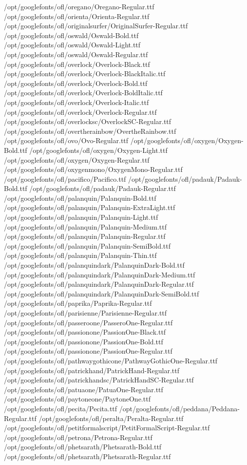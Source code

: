 /opt/googlefonts/ofl/oregano/Oregano-Regular.ttf
/opt/googlefonts/ofl/orienta/Orienta-Regular.ttf
/opt/googlefonts/ofl/originalsurfer/OriginalSurfer-Regular.ttf
/opt/googlefonts/ofl/oswald/Oswald-Bold.ttf
/opt/googlefonts/ofl/oswald/Oswald-Light.ttf
/opt/googlefonts/ofl/oswald/Oswald-Regular.ttf
/opt/googlefonts/ofl/overlock/Overlock-Black.ttf
/opt/googlefonts/ofl/overlock/Overlock-BlackItalic.ttf
/opt/googlefonts/ofl/overlock/Overlock-Bold.ttf
/opt/googlefonts/ofl/overlock/Overlock-BoldItalic.ttf
/opt/googlefonts/ofl/overlock/Overlock-Italic.ttf
/opt/googlefonts/ofl/overlock/Overlock-Regular.ttf
/opt/googlefonts/ofl/overlocksc/OverlockSC-Regular.ttf
/opt/googlefonts/ofl/overtherainbow/OvertheRainbow.ttf
/opt/googlefonts/ofl/ovo/Ovo-Regular.ttf
/opt/googlefonts/ofl/oxygen/Oxygen-Bold.ttf
/opt/googlefonts/ofl/oxygen/Oxygen-Light.ttf
/opt/googlefonts/ofl/oxygen/Oxygen-Regular.ttf
/opt/googlefonts/ofl/oxygenmono/OxygenMono-Regular.ttf
/opt/googlefonts/ofl/pacifico/Pacifico.ttf
/opt/googlefonts/ofl/padauk/Padauk-Bold.ttf
/opt/googlefonts/ofl/padauk/Padauk-Regular.ttf
/opt/googlefonts/ofl/palanquin/Palanquin-Bold.ttf
/opt/googlefonts/ofl/palanquin/Palanquin-ExtraLight.ttf
/opt/googlefonts/ofl/palanquin/Palanquin-Light.ttf
/opt/googlefonts/ofl/palanquin/Palanquin-Medium.ttf
/opt/googlefonts/ofl/palanquin/Palanquin-Regular.ttf
/opt/googlefonts/ofl/palanquin/Palanquin-SemiBold.ttf
/opt/googlefonts/ofl/palanquin/Palanquin-Thin.ttf
/opt/googlefonts/ofl/palanquindark/PalanquinDark-Bold.ttf
/opt/googlefonts/ofl/palanquindark/PalanquinDark-Medium.ttf
/opt/googlefonts/ofl/palanquindark/PalanquinDark-Regular.ttf
/opt/googlefonts/ofl/palanquindark/PalanquinDark-SemiBold.ttf
/opt/googlefonts/ofl/paprika/Paprika-Regular.ttf
/opt/googlefonts/ofl/parisienne/Parisienne-Regular.ttf
/opt/googlefonts/ofl/passeroone/PasseroOne-Regular.ttf
/opt/googlefonts/ofl/passionone/PassionOne-Black.ttf
/opt/googlefonts/ofl/passionone/PassionOne-Bold.ttf
/opt/googlefonts/ofl/passionone/PassionOne-Regular.ttf
/opt/googlefonts/ofl/pathwaygothicone/PathwayGothicOne-Regular.ttf
/opt/googlefonts/ofl/patrickhand/PatrickHand-Regular.ttf
/opt/googlefonts/ofl/patrickhandsc/PatrickHandSC-Regular.ttf
/opt/googlefonts/ofl/patuaone/PatuaOne-Regular.ttf
/opt/googlefonts/ofl/paytoneone/PaytoneOne.ttf
/opt/googlefonts/ofl/pecita/Pecita.ttf
/opt/googlefonts/ofl/peddana/Peddana-Regular.ttf
/opt/googlefonts/ofl/peralta/Peralta-Regular.ttf
/opt/googlefonts/ofl/petitformalscript/PetitFormalScript-Regular.ttf
/opt/googlefonts/ofl/petrona/Petrona-Regular.ttf
/opt/googlefonts/ofl/phetsarath/Phetsarath-Bold.ttf
/opt/googlefonts/ofl/phetsarath/Phetsarath-Regular.ttf

